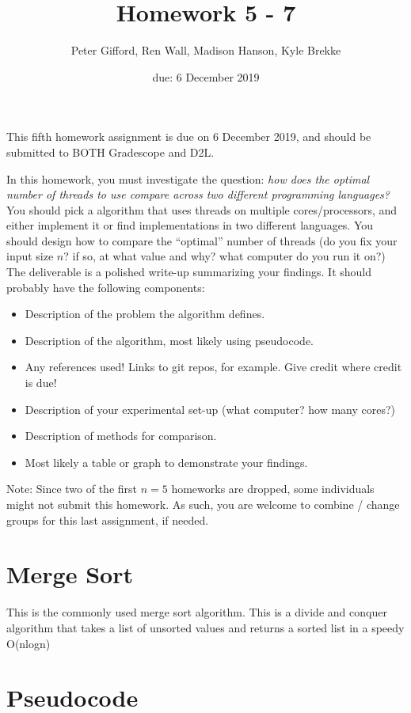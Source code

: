 \documentclass{article}
\author{Peter Gifford, Ren Wall, Madison Hanson, Kyle Brekke}
\date{due: 6 December 2019}
\title{Homework 5 - 7}
\begin{document}
\maketitle

This fifth homework assignment is due on 6 December 2019, and should be
submitted to BOTH Gradescope and D2L.

In this homework, you must investigate the question: \emph{how does the optimal
number of threads to use compare across two different programming languages?}
You should pick a algorithm that uses threads on multiple cores/processors,
and either implement it or find implementations in
two different languages. You should design how to compare the ``optimal'' number
of threads (do you fix your input size $n$?
if so, at what value and why? what computer do you
run it on?) The deliverable is a polished write-up summarizing your findings.
It should probably have the following components:
\begin{itemize}
    \item Description of the problem the algorithm defines.
    \item Description of the algorithm, most likely using pseudocode.
    \item Any references used! Links to git repos, for example.  Give credit
        where credit is due!
    \item Description of your experimental set-up (what computer? how many
        cores?)
    \item Description of methods for comparison.
    \item Most likely a table or graph to demonstrate your findings.
\end{itemize}

Note: Since two of the first $n=5$ homeworks are dropped, some individuals might
not submit this homework.  As such, you are welcome to combine / change groups
for this last assignment, if needed.

\section{Merge Sort}

This is the commonly used merge sort algorithm. This is a divide and conquer algorithm that takes a list of unsorted values and returns a sorted list in a speedy O(nlogn)

\section{Pseudocode}
\end{document}
